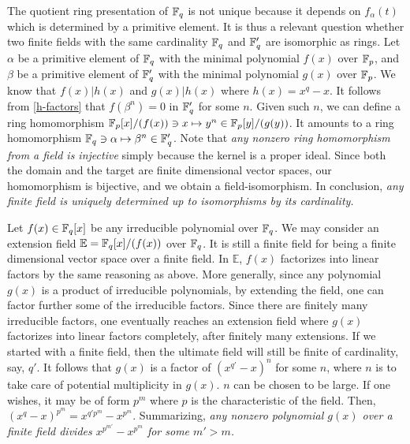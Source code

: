The quotient ring presentation of $\mathbb{F}_q$ is not unique because it depends on $f_\alpha(t)$ which
is determined by a primitive element. 
It is thus a relevant question whether two finite fields with the same cardinality $\mathbb{F}_q$ and $\mathbb{F}_q'$ 
are isomorphic as rings.
Let $\alpha$ be a primitive element of $\mathbb{F}_q$ with the minimal polynomial $f(x)$ over $\mathbb{F}_p$,
and $\beta$ be a  primitive element of $\mathbb{F}_q'$ with the minimal polynomial $g(x)$ over $\mathbb{F}_p$.
We know that $f(x) | h(x)$ and $g(x) | h(x)$ where $h(x) = x^q -x$.
It follows from \eqref{h-factors} that $f(\beta^n) = 0$ in $\mathbb{F}_q'$ for some $n$.
Given such $n$, we can define a ring homomorphism $\mathbb{F}_p[x]/(f(x)) \ni x \mapsto y^n \in \mathbb{F}_p[y]/(g(y))$.
It amounts to a ring homomorphism $\mathbb{F}_q \ni \alpha \mapsto \beta^n \in \mathbb{F}_q'$.
Note that {\em any nonzero ring homomorphism from a field is injective}
simply because the kernel is a proper ideal.
Since both the domain and the target are finite dimensional vector spaces,
our homomorphism is bijective, and we obtain a field-isomorphism.
In conclusion, {\em any finite field is uniquely determined up to isomorphisms by its cardinality.}


Let $f(x) \in \mathbb{F}_q[x]$ be any irreducible polynomial over $\mathbb{F}_q$.
We may consider an extension field $\mathbb E = \mathbb{F}_q[x]/(f(x))$ over $\mathbb{F}_q$.
It is still a finite field for being a finite dimensional vector space over a finite field.
In $\mathbb E$, $f(x)$ factorizes into linear factors by the same reasoning as above.
More generally, since any polynomial $g(x)$ is a product of irreducible polynomials,
by extending the field, one can factor further some of the irreducible factors.
Since there are finitely many irreducible factors, one eventually reaches an extension field
where $g(x)$ factorizes into linear factors completely, after finitely many extensions.
If we started with a finite field, then the ultimate field will still be finite of cardinality, say, $q'$.
It follows that $g(x)$ is a factor of $(x^{q'}-x)^n$ for some $n$,
where $n$ is to take care of potential multiplicity in $g(x)$.
$n$ can be chosen to be large. If one wishes, it may be of form $p^m$ 
where $p$ is the characteristic of the field.
Then, $(x^q -x)^{p^m} = x^{q' p^m} - x^{p^m}$.
Summarizing, {\em any nonzero polynomial $g(x)$ over a finite field divides $x^{p^{m'}} - x^{p^m}$
for some $m' > m$.}
